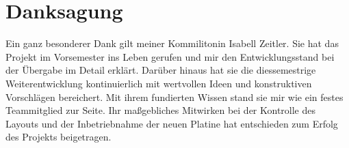 \thispagestyle{empty}
\section*{Danksagung}
\vspace{10mm}
Ein ganz besonderer Dank gilt meiner Kommilitonin Isabell Zeitler. Sie hat das Projekt im Vorsemester ins Leben gerufen und mir den Entwicklungsstand bei der Übergabe im Detail erklärt. Darüber hinaus hat sie die diessemestrige Weiterentwicklung kontinuierlich mit wertvollen Ideen und konstruktiven Vorschlägen bereichert. Mit ihrem fundierten Wissen stand sie mir wie ein festes Teammitglied zur Seite. Ihr maßgebliches Mitwirken bei der Kontrolle des Layouts und der Inbetriebnahme der neuen Platine hat entschieden zum Erfolg des Projekts beigetragen.
